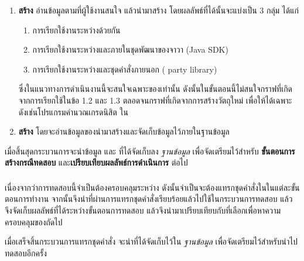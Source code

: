 \begin{enumerate}
    \item {\bf สร้าง{\scg}} อ่านข้อมูล{\CUT}ตามที่ผู้ใช้งานสนใจ แล้วนำมาสร้าง{\scg} โดยผลลัพธ์ที่ได้นั้นจะแบ่งเป็น 3 กลุ่ม ได้แก่
        \begin{enumerate}
            \item การเรียกใช้งานระหว่าง{\CUT}ด้วยกัน \label{ord:scgcut} 
            \item การเรียกใช้งานระหว่าง{\CUT}และ{\class}ภายในชุดพัฒนาของจาวา (Java SDK) \label{ord:scgjdk} 
            \item การเรียกใช้งานระหว่าง{\CUT}และชุดคำสั่งภายนอก ( party library) \label{ord:scg3rd} 
        \end{enumerate}
        ซึ่งในแนวทางการดำเนินงานนี้จะสนใจเฉพาะ{\scg}ของ{\CUT}เท่านั้น ดังนั้นในขั้นตอนนี้ไม่สนใจกราฟที่เกิดจากการเรียกใช้ในข้อ 1.2
        และ 1.3 ตลอดจนกราฟที่เกิดจากการสร้างวัตถุใหม่ เพื่อให้ได้{\scg}เฉพาะ{\CUT} ดังเช่น{\scg}โปรแกรมคํานวณเกรดนิสิต 
        ใน

    \item {\bf สร้าง{\cfg}} โดยจะอ่านข้อมูลของ{\CUT}นำมาสร้าง{\cfg}และจัดเก็บข้อมูลไว้ภายในฐานข้อมูล
\end{enumerate}

เมื่อสิ้นสุดกระบวนการจะนำข้อมูล{\bf {\scg}} และ{\bf {\cfg}} ที่ได้จัดเก็บลง {\it ฐานข้อมูล} เพื่อจัดเตรียมไว้สำหรับ 
{\bf ขั้นตอนการสร้างกรณีทดสอบ} และ{\bf เปรียบเทียบผลลัพธ์การดำเนินการ} ต่อไป

\subsubsection{\sourcecodeInstrumention}
\label{sec:sub:sub:srcInstrument}

เนื่องจากว่าการทดสอบนี้จำเป็นต้องครอบคลุม{\Path}ระหว่าง{\CUT} ดังนั้นจำเป็นจะต้องแทรกชุดคำสั่งใน{\sourcecode}ในแต่ละขั้นตอนการทำงาน 
จากนั้นจึงนำ{\sourcecode}ที่ผ่านการแทรกชุดคำสั่งเรียบร้อยแล้วไปใช้ในกระบวนการทดสอบ 
แล้วจึงจัดเก็บผลลัพธ์ที่ได้ระหว่างขั้นตอนการทดสอบ แล้วจึงนำมาเปรียบเทียบกับ{\TestPath}ที่เลือกเพื่อหาความครอบคลุมของ{\scg}ถัดไป

เมื่อเสร็จสิ้นกระบวนการแทรกชุดคำสั่ง จะนำ{\sourcecode}ที่ได้จัดเก็บไว้ใน {\it ฐานข้อมูล} เพื่อจัดเตรียมไว้สำหรับนำไปทดสอบอีกครั้ง

\subsection{\testcaseGeneration}
\label{sec:sub:tcg}


